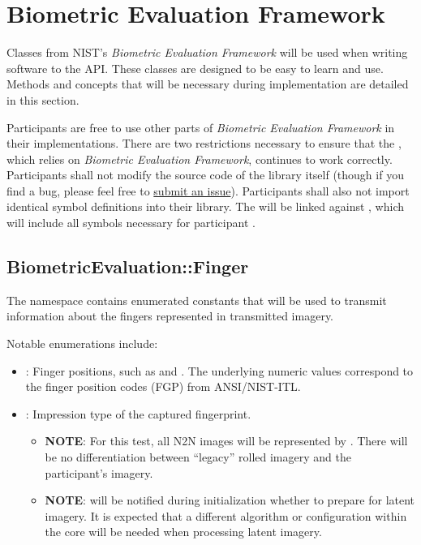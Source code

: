\section{Biometric Evaluation Framework}
\label{sec:libbiomeval}

Classes from NIST's \textit{Biometric Evaluation Framework} will be used when
writing software to the \project API.  These classes are designed to be easy to
learn and use. Methods and concepts that will be necessary during implementation
are detailed in this section.

Participants are free to use other parts of
\textit{Biometric Evaluation Framework}
in their implementations. There are two restrictions necessary to ensure that
the \testdriver, which relies on \textit{Biometric Evaluation Framework},
continues to work correctly. Participants shall not modify the source code of
the library itself (though if you find a bug, please feel free to
\href{https://github.com/usnistgov/BiometricEvaluation/issues}{submit an
issue}). Participants shall also not import identical symbol definitions into
their library. The \testdriver will be linked against \libbiomevalVersion, which
will include all symbols necessary for participant \libs.

\subsection{BiometricEvaluation::Finger}

\large{}

The  namespace contains enumerated constants that will be used to
transmit information about the fingers represented in transmitted imagery.

Notable enumerations include:
\begin{itemize}
	\item {}: Finger positions, such as
	 and . The underlying numeric values
	correspond to the finger position codes (FGP) from ANSI/NIST-ITL.

	\item {}: Impression type of the captured
	fingerprint.
		\begin{itemize}
			\item \textbf{NOTE}: For this test, all N2N images will
			be represented by . There will be
			no differentiation between ``legacy'' rolled imagery
			and the participant's \scanner imagery.
			
			\item \textbf{NOTE}: \implementations will be notified
			during initialization whether to prepare for latent
			imagery. It is expected that a different algorithm or
			configuration within the core \lib will be needed when
			processing latent imagery.
		\end{itemize}
\end{itemize}

